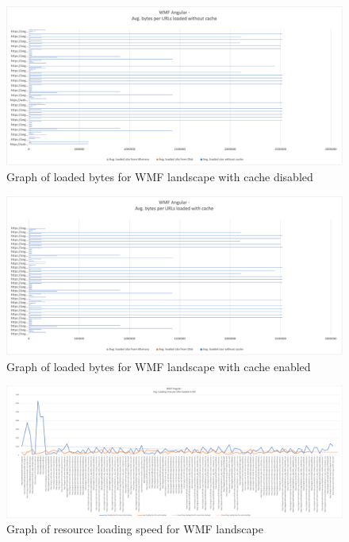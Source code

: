 \newpage
\begin{figure}[!h]
	\centering
	\includegraphics[width=1.4\textwidth, angle=90]{Figures/wmf_bytes.png}
	\caption{Graph of loaded bytes for WMF landscape with cache disabled}
	\label{fig:appendix_1_28}
\end{figure}
\newpage
\begin{figure}[!h]
	\centering
	\includegraphics[width=1.4\textwidth, angle=90]{Figures/wmf_bytes_cache.png}
	\caption{Graph of loaded bytes for WMF landscape with cache enabled}
	\label{fig:appendix_1_29}
\end{figure}
\newpage
\begin{figure}[!h]
	\centering
	\includegraphics[width=1.4\textwidth, angle=90]{Figures/wmf_speed.png}
	\caption{Graph of resource loading speed for WMF landscape}
	\label{fig:appendix_1_30}
\end{figure}
\newpage